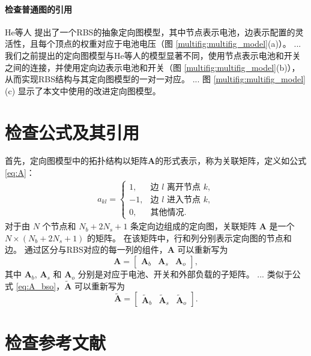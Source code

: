 \documentclass[a4paper,UTF8]{ctexart}
\begin{document}
\paragraph{检查普通图的引用}
He等人 \cite{heExploringAdaptiveReconfiguration2013} 提出了一个RBS的抽象定向图模型，其中节点表示电池，边表示配置的灵活性，且每个顶点的权重对应于电池电压（图 \ref{multifig:multifig_model}(a)）。 
...
我们之前提出的定向图模型与He等人的模型显著不同，使用节点表示电池和开关之间的连接，并使用定向边表示电池和开关（图 \ref{multifig:multifig_model}(b)），从而实现RBS结构与其定向图模型的一对一对应。
...
图 \ref{multifig:multifig_model}(c) 显示了本文中使用的改进定向图模型。

\section{检查公式及其引用}

首先，定向图模型中的拓扑结构以矩阵$\boldsymbol{A}$的形式表示，称为关联矩阵，定义如公式 \eqref{eq:A}：
\begin{align}\label{eq:A}
    a_{kl}=
    \begin{cases}
        1,  & \text{边 $l$ 离开节点 $k$},\\
        -1, & \text{边 $l$ 进入节点 $k$},\\
        0,  & \text{其他情况}.
    \end{cases}
\end{align}
对于由 $N$ 个节点和 $N_b+2N_s+1$ 条定向边组成的定向图，关联矩阵 $\boldsymbol{A}$ 是一个 $N\times(N_b+2N_s+1)$ 的矩阵。 
在该矩阵中，行和列分别表示定向图的节点和边。
通过区分与RBS对应的每一列的组件，$\boldsymbol{A}$ 可以重新写为
\begin{equation}\label{eq:A_bso}
    \boldsymbol{A} =
    \begin{bmatrix}
        \boldsymbol{A}_b & \boldsymbol{A}_s & \boldsymbol{A}_o
    \end{bmatrix},
\end{equation}
其中 $\boldsymbol{A}_b$, $\boldsymbol{A}_s$ 和 $\boldsymbol{A}_o$ 分别是对应于电池、开关和外部负载的子矩阵。
...
类似于公式 \eqref{eq:A_bso}，$\boldsymbol{\tilde{A}}$ 可以重新写为
\begin{equation}\label{eq:A_bso_tilde}
    \boldsymbol{\tilde{A}} =
    \begin{bmatrix}
        \boldsymbol{\tilde{A}}_b & \boldsymbol{\tilde{A}}_s & \boldsymbol{\tilde{A}}_o
    \end{bmatrix}.
\end{equation}

\section{检查参考文献}



\end{document}

